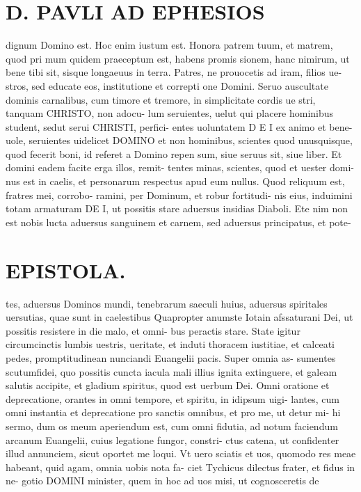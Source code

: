 \documentclass{article}
\begin{document}
\begin{pages}
\section*{D. PAVLI AD EPHESIOS }
\marginpar{[ p.]}
\marginpar{[ p.]}
\marginpar{[ p.]}
\marginpar{[ p.]}\pstart dignum Domino est. Hoc enim iustum est. Honora patrem tuum, et matrem, quod pri mum quidem praeceptum est, habens promis sionem, hanc nimirum, ut bene tibi sit, sisque longaeuus in terra.  \pend\pstart Patres, ne prouocetis ad iram, filios ue- stros, sed educate eos, institutione et correpti one Domini.  \pend\pstart Seruo auscultate dominis carnalibus, cum timore et tremore, in simplicitate cordis ue stri, tanquam CHRISTO, non adocu- lum seruientes, uelut qui placere hominibus student, sedut serui CHRISTI, perfici- entes uoluntatem D E I ex animo et bene- uole, seruientes uidelicet DOMINO et non hominibus, scientes quod unusquisque, quod fecerit boni, id referet a Domino repen sum, siue seruus sit, siue liber.  \pend\pstart Et domini eadem facite erga illos, remit- tentes minas, scientes, quod et uester domi- nus est in caelis, et personarum respectus apud eum nullus.  \pend\pstart Quod reliquum est, fratres mei, corrobo- ramini, per Dominum, et robur fortitudi- nis eius, induimini totam armaturam DE I, ut possitis stare aduersus insidias Diaboli. Ete nim non est nobis lucta aduersus sanguinem et carnem, sed aduersus principatus, et pote-  \pend
\section*{EPISTOLA.  }
\marginpar{[ p.10.  ]}
\marginpar{[ p.]}
\marginpar{[ p.]}
\marginpar{[ p.]}\pstart tes, aduersus Dominos mundi, tenebrarum saeculi huius, aduersus spiritales uersutias, quae sunt in caelestibus  \pend\pstart Quapropter anumste Iotain afssaturani Dei, ut possitis resistere in die malo, et omni- bus peractis stare. State igitur circumcinctis lumbis uestris, ueritate, et induti thoracem iustitiae, et calceati pedes, promptitudinean nunciandi Euangelii pacis. Super omnia as- sumentes scutumfidei, quo possitis cuncta iacula mali illius ignita extinguere, et galeam salutis accipite, et gladium spiritus, quod est uerbum Dei.  \pend\pstart Omni oratione et deprecatione, orantes in omni tempore, et spiritu, in idipsum uigi- lantes, cum omni instantia et deprecatione pro sanctis omnibus, et pro me, ut detur mi- hi sermo, dum os meum aperiendum est, cum omni fidutia, ad notum faciendum arcanum Euangelii, cuius legatione fungor, constri- ctus catena, ut confidenter illud annunciem, sicut oportet me loqui.  \pend\pstart Vt uero sciatis et uos, quomodo res meae habeant, quid agam, omnia uobis nota fa- ciet Tychicus dilectus frater, et fidus in ne- gotio DOMINI minister, quem in hoc ad uos misi, ut cognosceretis de  \pend

\end{pages}
\end{document}
